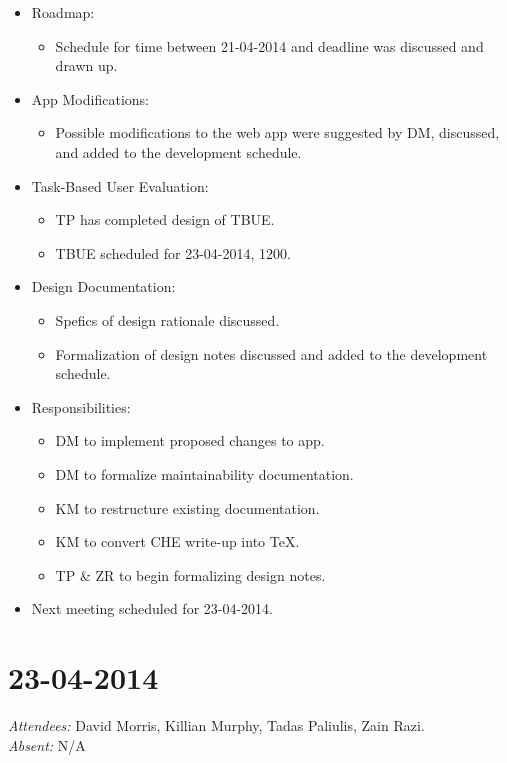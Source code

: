 \documentclass{article}
\begin{document}
\begin{itemize}
\item Roadmap:
  \begin{itemize}
  \item Schedule for time between 21-04-2014 and deadline was discussed and drawn up.
  \end{itemize}
\item App Modifications:
  \begin{itemize}
  \item Possible modifications to the web app were suggested by DM, discussed, and added to the development schedule.
  \end{itemize}
\item Task-Based User Evaluation:
  \begin{itemize}
  \item TP has completed design of TBUE.
  \item TBUE scheduled for 23-04-2014, 1200.
  \end{itemize}
\item Design Documentation:
  \begin{itemize}
  \item Spefics of design rationale discussed.
  \item Formalization of design notes discussed and added to the development schedule.
  \end{itemize}
\item Responsibilities:
  \begin{itemize}
  \item DM to implement proposed changes to app.
  \item DM to formalize maintainability documentation.
  \item KM to restructure existing documentation.
  \item KM to convert CHE write-up into TeX.
  \item TP \& ZR to begin formalizing design notes.
  \end{itemize}
\item Next meeting scheduled for 23-04-2014.
\end{itemize}

\clearpage

\section*{23-04-2014}
\vspace{0.5cm}
\emph{Attendees: }David Morris, Killian Murphy, Tadas Paliulis, Zain Razi.
\\
\emph{Absent: }N/A
\end{document}
